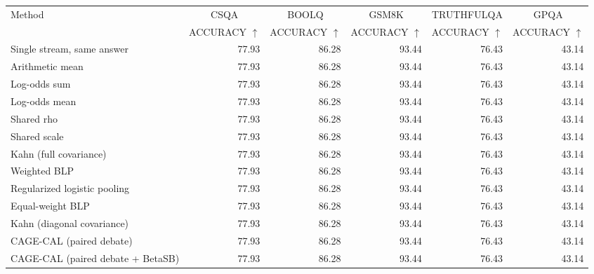\begin{tabular}{lrrrrr}
\toprule
Method & \multicolumn{1}{c}{CSQA} & \multicolumn{1}{c}{BOOLQ} & \multicolumn{1}{c}{GSM8K} & \multicolumn{1}{c}{TRUTHFULQA} & \multicolumn{1}{c}{GPQA} \\
 & ACCURACY $\uparrow$ & ACCURACY $\uparrow$ & ACCURACY $\uparrow$ & ACCURACY $\uparrow$ & ACCURACY $\uparrow$ \\
\midrule
Single stream, same answer & 77.93 & 86.28 & 93.44 & 76.43 & 43.14 \\
Arithmetic mean & 77.93 & 86.28 & 93.44 & 76.43 & 43.14 \\
Log-odds sum & 77.93 & 86.28 & 93.44 & 76.43 & 43.14 \\
Log-odds mean & 77.93 & 86.28 & 93.44 & 76.43 & 43.14 \\
Shared rho & 77.93 & 86.28 & 93.44 & 76.43 & 43.14 \\
Shared scale & 77.93 & 86.28 & 93.44 & 76.43 & 43.14 \\
Kahn (full covariance) & 77.93 & 86.28 & 93.44 & 76.43 & 43.14 \\
Weighted BLP & 77.93 & 86.28 & 93.44 & 76.43 & 43.14 \\
Regularized logistic pooling & 77.93 & 86.28 & 93.44 & 76.43 & 43.14 \\
Equal-weight BLP & 77.93 & 86.28 & 93.44 & 76.43 & 43.14 \\
Kahn (diagonal covariance) & 77.93 & 86.28 & 93.44 & 76.43 & 43.14 \\
CAGE-CAL (paired debate) & 77.93 & 86.28 & 93.44 & 76.43 & 43.14 \\
CAGE-CAL (paired debate + BetaSB) & 77.93 & 86.28 & 93.44 & 76.43 & 43.14 \\
\bottomrule
\end{tabular}
